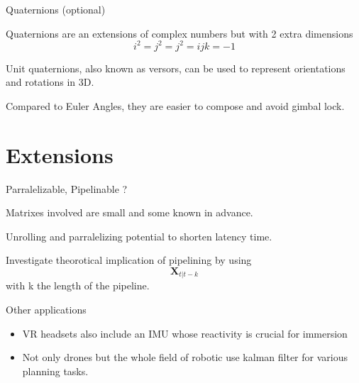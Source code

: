 \begin{frame}{Quaternions (optional)}

Quaternions are an extensions of complex numbers but with 2 extra
dimensions \[i^2=j^2=j^2=ijk=-1\]

Unit quaternions, also known as versors, can be used to represent
orientations and rotations in 3D.

Compared to Euler Angles, they are easier to compose and avoid gimbal
lock.

\end{frame}

\section{Extensions}\label{extensions}

\begin{frame}{Parralelizable, Pipelinable ?}

Matrixes involved are small and some known in advance.

Unrolling and parralelizing potential to shorten latency time.

Investigate theorotical implication of pipelining by using
\[\mathbf{X}_{t|t-k}\] with k the length of the pipeline.

\end{frame}

\begin{frame}{Other applications}

\begin{itemize}
\tightlist
\item
  VR headsets also include an IMU whose reactivity is crucial for
  immersion
\item
  Not only drones but the whole field of robotic use kalman filter for
  various planning tasks.
\end{itemize}

\end{frame}
